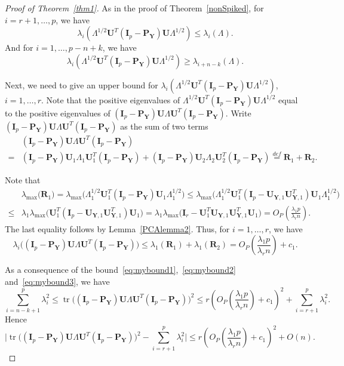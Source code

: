\documentclass[12pt]{article} %
\DeclareMathOperator{\mytr}{tr}
\newcommand{\bP}{\mathbf{P}}
\newcommand{\bY}{\mathbf{Y}}
\newcommand{\bR}{\mathbf{R}}
\newcommand{\bI}{\mathbf{I}}
\newcommand{\bU}{\mathbf{U}}
\theoremstyle{definition}
\begin{document}
\begin{proof}[\textrm{Proof of Theorem~\ref{thm1}}]
    As in the proof of Theorem~\ref{nonSpiked}, for $i=r+1,\ldots, p$, we have
    \begin{equation}\label{eq:mybound1}
    \lambda_i (\Lambda^{1/2}\bU^T (\bI_p-\bP_{\bY})\bU\Lambda^{1/2})\leq
    \lambda_i (\Lambda).
    \end{equation}
     And for $i=1,\ldots, p-n+k$, we have
    \begin{equation}\label{eq:mybound2}
    \lambda_i (\Lambda^{1/2}\bU^T (\bI_p-\bP_{\bY})\bU\Lambda^{1/2})\geq
    \lambda_{i+n-k} (\Lambda).
    \end{equation}

    Next, we need to give an upper bound for $\lambda_i(\Lambda^{1/2}\bU^T (\bI_p-\bP_{\bY})\bU\Lambda^{1/2})$, $i=1,\ldots,r$.
    Note that the positive eigenvalues of $\Lambda^{1/2}\bU^T (\bI_p-\bP_{\bY})\bU\Lambda^{1/2}$  equal to the positive eigenvalues of $(\bI_p-\bP_{\bY})\bU\Lambda \bU^T (\bI_p-\bP_{\bY})$.
Write $(\bI_p-\bP_{\bY})\bU\Lambda \bU^T (\bI_p-\bP_{\bY})$ as the sum of two terms
$$
\begin{aligned}
&(\bI_p-\bP_{\bY})\bU\Lambda \bU^T (\bI_p-\bP_{\bY})
\\
=&
(\bI_p-\bP_{\bY})\bU_1\Lambda_1 \bU_1^T(\bI_p-\bP_{\bY})+(\bI_p-\bP_{\bY})\bU_2\Lambda_2 \bU_2^T (\bI_p-\bP_{\bY})
\overset{def}{=}\bR_1+\bR_2.
\end{aligned}
$$

Note that
$$
\begin{aligned}
&\lambda_{\max}\big( \bR_1 \big)
=
\lambda_{\max}\big(\Lambda_1^{1/2} \bU_1^T(\bI_p-\bP_{\bY}) \bU_1 \Lambda_1^{1/2}\big)
\leq 
\lambda_{\max}\big(\Lambda_1^{1/2} \bU_1^T(\bI_p-\bU_{\bY,1}\bU_{\bY,1}^T) \bU_1 \Lambda_1^{1/2}\big)\\
\leq &
\lambda_1
\lambda_{\max}\big(\bU_1^T(\bI_p-\bU_{\bY,1}\bU_{\bY,1}^T) \bU_1 \big)
= 
\lambda_1
\lambda_{\max}\big(\bI_r - \bU_1^T\bU_{\bY,1}\bU_{\bY,1}^T \bU_1 \big)=O_P(\frac{\lambda_1 p}{\lambda_r n}).
\end{aligned}
$$
    The last equality follows by Lemma~\ref{PCAlemma2}.
Thus, for $i=1,\ldots, r$, we have
    \begin{equation}\label{eq:mybound3}
\lambda_i\big((\bI_p-\bP_{\bY})\bU\Lambda \bU^T (\bI_p-\bP_{\bY})\big)\leq
\lambda_1(\bR_1)+\lambda_1(\bR_2)= O_P(\frac{\lambda_1 p}{\lambda_r n}) + c_1.
\end{equation}

    As a consequence of the bound~\eqref{eq:mybound1},~\eqref{eq:mybound2} and~\eqref{eq:mybound3}, we have
$$
    \sum_{i=n-k+1}^p \lambda_i^2\leq \mytr\big((\bI_p-\bP_{\bY})\bU\Lambda \bU^T (\bI_p-\bP_{\bY})\big)^2 \leq  r(O_P(\frac{\lambda_1 p}{\lambda_r n})+c_1)^2+\sum_{i=r+1}^p \lambda_i^2.
$$
    Hence
    \begin{equation}\label{eq:spiketrace1}
    \big|\mytr\big((\bI_p-\bP_{\bY})\bU\Lambda \bU^T (\bI_p-\bP_{\bY})\big)^2 - \sum_{i=r+1}^p \lambda_i^2 \big|\leq 
    r(O_P(\frac{\lambda_1 p}{\lambda_r n})+c_1)^2+O(n).
    \end{equation}


\end{proof}
\end{document}
